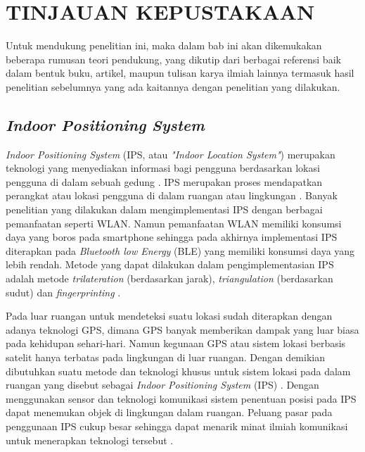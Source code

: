\fancyhf{} 
\fancyfoot[C]{\thepage}
\chapter{TINJAUAN KEPUSTAKAAN}

\par Untuk mendukung penelitian ini, maka dalam bab ini akan dikemukakan beberapa rumusan teori pendukung, yang dikutip dari berbagai referensi baik dalam bentuk buku, artikel, maupun tulisan karya ilmiah lainnya termasuk hasil penelitian sebelumnya yang ada kaitannya dengan penelitian yang dilakukan.

\section{\textit{Indoor Positioning System}}
\textit{Indoor Positioning System} (IPS, atau \textit{"Indoor Location System"}) merupakan teknologi yang menyediakan informasi bagi pengguna berdasarkan lokasi pengguna di dalam sebuah gedung \citep{brena2017evolution}. IPS merupakan proses mendapatkan perangkat atau lokasi pengguna di dalam ruangan atau lingkungan \citep{zafari2019survey}. Banyak penelitian yang dilakukan dalam mengimplementasi IPS dengan berbagai pemanfaatan seperti WLAN. Namun pemanfaatan WLAN memiliki konsumsi daya yang boros pada smartphone sehingga pada akhirnya implementasi IPS diterapkan pada \textit{Bluetooth low Energy} (BLE) yang memiliki konsumsi daya yang lebih rendah. Metode yang dapat dilakukan dalam pengimplementasian IPS adalah metode \textit{trilateration} (berdasarkan jarak), \textit{triangulation} (berdasarkan sudut) dan \textit{fingerprinting} \citep{puspitasari2020}.

\par Pada luar ruangan untuk mendeteksi suatu lokasi sudah diterapkan dengan adanya teknologi GPS, dimana GPS banyak memberikan dampak yang luar biasa pada kehidupan sehari-hari. Namun kegunaan GPS atau sistem lokasi berbasis satelit hanya terbatas pada lingkungan di luar ruangan. Dengan demikian dibutuhkan suatu metode dan teknologi khusus untuk sistem lokasi pada dalam ruangan yang disebut sebagai \textit{Indoor Positioning System} (IPS) \citep{brena2017evolution}. Dengan menggunakan sensor dan teknologi komunikasi sistem penentuan posisi pada IPS dapat menemukan objek di lingkungan dalam ruangan. Peluang pasar pada penggunaan IPS cukup besar sehingga dapat menarik minat ilmiah komunikasi untuk menerapkan teknologi tersebut \citep{brena2017evolution}.

